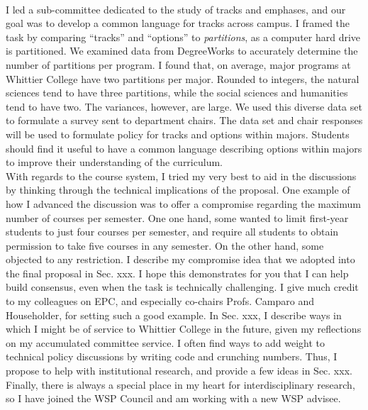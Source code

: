 \documentclass[../../main.tex]{subfiles}
\begin{document}
\\
\vspace{0.25cm}
I led a sub-committee dedicated to the study of tracks and emphases, and our goal was to develop a common language for tracks across campus.  I framed the task by comparing ``tracks'' and ``options'' to \textit{partitions}, as a computer hard drive is partitioned.  We examined data from DegreeWorks to accurately determine the number of partitions per program.  I found that, on average, major programs at Whittier College have two partitions per major. Rounded to integers, the natural sciences tend to have three partitions, while the social sciences and humanities tend to have two.  The variances, however, are large.  We used this diverse data set to formulate a survey sent to department chairs.  The data set and chair responses will be used to formulate policy for tracks and options within majors.  Students should find it useful to have a common language describing options within majors to improve their understanding of the curriculum.
\\
\vspace{0.25cm}
With regards to the course system, I tried my very best to aid in the discussions by thinking through the technical implications of the proposal.  One example of how I advanced the discussion was to offer a compromise regarding the maximum number of courses per semester.  One one hand, some wanted to limit first-year students to just four courses per semester, and require all students to obtain permission to take five courses in any semester.  On the other hand, some objected to any restriction.  I describe my compromise idea that we adopted into the final proposal in Sec. xxx.  I hope this demonstrates for you that I can help build consensus, even when the task is technically challenging.  I give much credit to my colleagues on EPC, and especially co-chairs Profs. Camparo and Householder, for setting such a good example.  In Sec. xxx, I describe ways in which I might be of service to Whittier College in the future, given my reflections on my accumulated committee service.  I often find ways to add weight to technical policy discussions by writing code and crunching numbers.  Thus, I propose to help with institutional research, and provide a few ideas in Sec. xxx.  Finally, there is always a special place in my heart for interdisciplinary research, so I have joined the WSP Council and am working with a new WSP advisee.
\\
\vspace{0.25cm}
\end{document}
